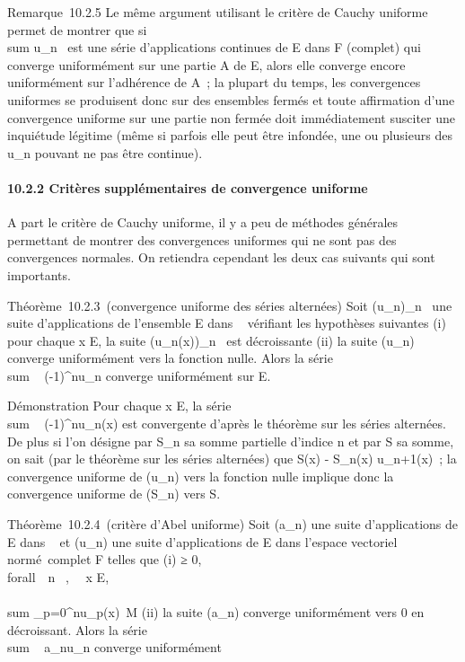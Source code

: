 \documentclass[]{article}
\begin{document}
Remarque~10.2.5 Le même argument utilisant le critère de Cauchy uniforme
permet de montrer que si
\\sum  u_n~ est
une série d'applications continues de E dans F (complet) qui converge
uniformément sur une partie A de E, alors elle converge encore
uniformément sur l'adhérence \overlineA de A~; la
plupart du temps, les convergences uniformes se produisent donc sur des
ensembles fermés et toute affirmation d'une convergence uniforme sur une
partie non fermée doit immédiatement susciter une inquiétude légitime
(même si parfois elle peut être infondée, une ou plusieurs des
u_n pouvant ne pas être continue).

\paragraph{10.2.2 Critères supplémentaires de convergence uniforme}

A part le critère de Cauchy uniforme, il y a peu de méthodes générales
permettant de montrer des convergences uniformes qui ne sont pas des
convergences normales. On retiendra cependant les deux cas suivants qui
sont importants.

Théorème~10.2.3~(convergence uniforme des séries alternées) Soit
(u_n)_n\in{}~ une suite d'applications de l'ensemble E
dans ~ vérifiant les hypothèses suivantes (i) pour chaque x \in E, la
suite (u_n(x))_n\in{}~ est décroissante (ii) la suite
(u_n) converge uniformément vers la fonction nulle. Alors la
série \\sum ~
(-1)^nu_n converge uniformément sur E.

Démonstration Pour chaque x \in E, la série
\\sum ~
(-1)^nu_n(x) est convergente d'après le théorème sur
les séries alternées. De plus si l'on désigne par S_n sa somme
partielle d'indice n et par S sa somme, on sait (par le théorème sur les
séries alternées) que S(x) - S_n(x)\leq
u_n+1(x)~; la convergence uniforme de (u_n) vers la
fonction nulle implique donc la convergence uniforme de (S_n)
vers S.

Théorème~10.2.4~(critère d'Abel uniforme) Soit (a_n) une suite
d'applications de E dans ~ et (u_n) une suite d'applications de
E dans l'espace vectoriel normé~complet F telles que (i)
\existsM ≥ 0, \\forall~~n \in {}~,
\forall~~x \in E,
\\\\sum
 _p=0^nu_p(x)\ \leq M
(ii) la suite (a_n) converge uniformément vers 0 en
décroissant. Alors la série
\\sum ~
a_nu_n converge uniformément
\end{document}

